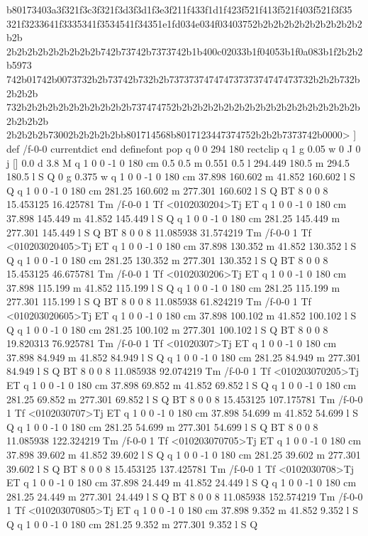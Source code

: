 b80173403a3f321f3c3f321f3d3f3d1f3e3f211f433f1d1f423f521f413f521f403f521f3f35
321f3233641f3335341f3534541f34351e1fd034e034f03403752b2b2b2b2b2b2b2b2b2b2b2b
2b2b2b2b2b2b2b2b2b742b73742b7373742b1b400c02033b1f04053b1f0a083b1f2b2b2b5973
742b01742b0073732b2b73742b732b2b73737374747473737374747473732b2b2b732b2b2b2b
732b2b2b2b2b2b2b2b2b2b2b737474752b2b2b2b2b2b2b2b2b2b2b2b2b2b2b2b2b2b2b2b2b2b
2b2b2b2b73002b2b2b2b2bb801714568b8017123447374752b2b2b7373742b0000>
] def
/f-0-0 currentdict end definefont pop
q 0 0 294 180 rectclip q
1 g
0.05 w
0 J
0 j
[] 0.0 d
3.8 M q 1 0 0 -1 0 180 cm
0.5 0.5 m 0.551 0.5 l 294.449 180.5 m 294.5 180.5 l S Q
0 g
0.375 w
q 1 0 0 -1 0 180 cm
37.898 160.602 m 41.852 160.602 l S Q
q 1 0 0 -1 0 180 cm
281.25 160.602 m 277.301 160.602 l S Q
BT
8 0 0 8 15.453125 16.425781 Tm
/f-0-0 1 Tf
<0102030204>Tj
ET
q 1 0 0 -1 0 180 cm
37.898 145.449 m 41.852 145.449 l S Q
q 1 0 0 -1 0 180 cm
281.25 145.449 m 277.301 145.449 l S Q
BT
8 0 0 8 11.085938 31.574219 Tm
/f-0-0 1 Tf
<010203020405>Tj
ET
q 1 0 0 -1 0 180 cm
37.898 130.352 m 41.852 130.352 l S Q
q 1 0 0 -1 0 180 cm
281.25 130.352 m 277.301 130.352 l S Q
BT
8 0 0 8 15.453125 46.675781 Tm
/f-0-0 1 Tf
<0102030206>Tj
ET
q 1 0 0 -1 0 180 cm
37.898 115.199 m 41.852 115.199 l S Q
q 1 0 0 -1 0 180 cm
281.25 115.199 m 277.301 115.199 l S Q
BT
8 0 0 8 11.085938 61.824219 Tm
/f-0-0 1 Tf
<010203020605>Tj
ET
q 1 0 0 -1 0 180 cm
37.898 100.102 m 41.852 100.102 l S Q
q 1 0 0 -1 0 180 cm
281.25 100.102 m 277.301 100.102 l S Q
BT
8 0 0 8 19.820313 76.925781 Tm
/f-0-0 1 Tf
<01020307>Tj
ET
q 1 0 0 -1 0 180 cm
37.898 84.949 m 41.852 84.949 l S Q
q 1 0 0 -1 0 180 cm
281.25 84.949 m 277.301 84.949 l S Q
BT
8 0 0 8 11.085938 92.074219 Tm
/f-0-0 1 Tf
<010203070205>Tj
ET
q 1 0 0 -1 0 180 cm
37.898 69.852 m 41.852 69.852 l S Q
q 1 0 0 -1 0 180 cm
281.25 69.852 m 277.301 69.852 l S Q
BT
8 0 0 8 15.453125 107.175781 Tm
/f-0-0 1 Tf
<0102030707>Tj
ET
q 1 0 0 -1 0 180 cm
37.898 54.699 m 41.852 54.699 l S Q
q 1 0 0 -1 0 180 cm
281.25 54.699 m 277.301 54.699 l S Q
BT
8 0 0 8 11.085938 122.324219 Tm
/f-0-0 1 Tf
<010203070705>Tj
ET
q 1 0 0 -1 0 180 cm
37.898 39.602 m 41.852 39.602 l S Q
q 1 0 0 -1 0 180 cm
281.25 39.602 m 277.301 39.602 l S Q
BT
8 0 0 8 15.453125 137.425781 Tm
/f-0-0 1 Tf
<0102030708>Tj
ET
q 1 0 0 -1 0 180 cm
37.898 24.449 m 41.852 24.449 l S Q
q 1 0 0 -1 0 180 cm
281.25 24.449 m 277.301 24.449 l S Q
BT
8 0 0 8 11.085938 152.574219 Tm
/f-0-0 1 Tf
<010203070805>Tj
ET
q 1 0 0 -1 0 180 cm
37.898 9.352 m 41.852 9.352 l S Q
q 1 0 0 -1 0 180 cm
281.25 9.352 m 277.301 9.352 l S Q
